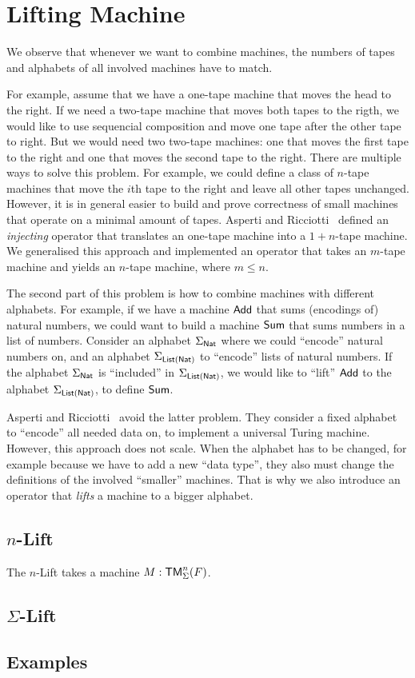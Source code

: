 \chapter{Lifting Machine}
\label{chap:lifting}

We observe that whenever we want to combine machines, the numbers of tapes and alphabets of all involved machines have to match.

For example, assume that we have a one-tape machine that moves the head to the right.  If we need a two-tape machine that moves both tapes to the
rigth, we would like to use sequencial composition and move one tape after the other tape to right.  But we would need two two-tape machines: one that
moves the first tape to the right and one that moves the second tape to the right.  There are multiple ways to solve this problem.  For example, we
could define a class of $n$-tape machines that move the $i$th tape to the right and leave all other tapes unchanged.  However, it is in general easier
to build and prove correctness of small machines that operate on a minimal amount of tapes.  Asperti and Ricciotti~\cite{asperti2015} defined an
\emph{injecting} operator that translates an one-tape machine into a $1+n$-tape machine.  We generalised this approach and implemented an operator
that takes an $m$-tape machine and yields an $n$-tape machine, where $m \le n$.

The second part of this problem is how to combine machines with different alphabets.  For example, if we have a machine $\textsf{Add}$ that sums
(encodings of) natural numbers, we could want to build a machine $\textsf{Sum}$ that sums numbers in a list of numbers.  Consider an alphabet
$\Sigma_{\textsf{Nat}}$ where we could ``encode'' natural numbers on, and an alphabet $\Sigma_{\textsf{List}(\textsf{Nat})}$ to ``encode'' lists of natural numbers.  If the
alphabet $\Sigma_{\textsf{Nat}}$ is ``included'' in $\Sigma_{\textsf{List}(\textsf{Nat})}$, we would like to ``lift'' $\textsf{Add}$ to the alphabet $\Sigma_{\textsf{List}(\textsf{Nat})}$, to
define $\textsf{Sum}$.

Asperti and Ricciotti~\cite{asperti2015} avoid the latter problem.  They consider a fixed alphabet to ``encode'' all needed data on, to implement a
universal Turing machine.  However, this approach does not scale.  When the alphabet has to be changed, for example because we have to add a new
``data type'', they also must change the definitions of the involved ``smaller'' machines.  That is why we also introduce an operator that
\emph{lifts} a machine to a bigger alphabet.

\section{$n$-Lift}
\label{sec:n-Lift}

The $n$-Lift takes a machine $M:\textsf{TM}_\Sigma^n(F)$.

\todo{}


\section{$\Sigma$-Lift}
\label{sec:sigma-Lift}


\todo{}




\section{Examples}
\label{sec:lifting-examples}

\todo{}


